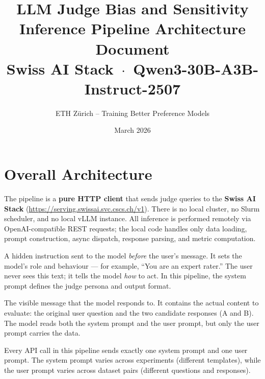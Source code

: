 \documentclass[11pt,a4paper]{article}
\title{%
  \vspace{-1cm}
  \textbf{LLM Judge Bias and Sensitivity}\\[4pt]
  \Large Inference Pipeline Architecture Document\\[6pt]
  \normalsize Swiss AI Stack \,$\cdot$\, Qwen3-30B-A3B-Instruct-2507
}
\author{ETH Z\"urich -- Training Better Preference Models}
\date{March 2026}
\begin{document}
\maketitle
\thispagestyle{fancy}
\tableofcontents
\newpage

\section{Overall Architecture}\label{sec:architecture}

\begin{conceptbox}
The pipeline is a \textbf{pure HTTP client} that sends judge queries to the
\textbf{Swiss AI Stack} (\url{https://serving.swissai.svc.cscs.ch/v1}).
There is no local cluster, no Slurm scheduler, and no local vLLM instance.
All inference is performed remotely via OpenAI-compatible REST requests;
the local code handles only data loading, prompt construction, async
dispatch, response parsing, and metric computation.
\end{conceptbox}

\begin{notebox}
\begin{description}[nosep, leftmargin=1.5cm]
  \item[System prompt] A hidden instruction sent to the model \emph{before}
    the user's message. It sets the model's role and behaviour --- for example,
    ``You are an expert rater.'' The user never sees this text; it tells the
    model \emph{how} to act. In this pipeline, the system prompt defines the
    judge persona and output format.
  \item[User prompt] The visible message that the model responds to. It
    contains the actual content to evaluate: the original user question and
    the two candidate responses (A and B). The model reads both the system
    prompt and the user prompt, but only the user prompt carries the data.
\end{description}

\medskip
\noindent Every API call in this pipeline sends exactly one system prompt and one user
prompt. The system prompt varies across experiments (different templates), while
the user prompt varies across dataset pairs (different questions and responses).
\end{notebox}
\end{document}
